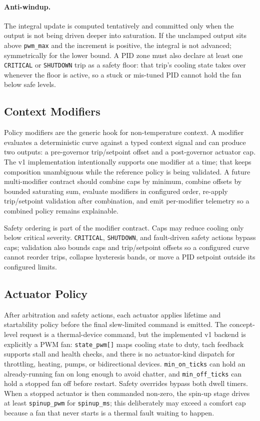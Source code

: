 \paragraph{Anti-windup.} The integral update is computed tentatively and committed only when the output is not being driven deeper into saturation. If the unclamped output sits above \texttt{pwm\_max} and the increment is positive, the integral is not advanced; symmetrically for the lower bound. A PID zone must also declare at least one \texttt{CRITICAL} or \texttt{SHUTDOWN} trip as a safety floor: that trip's cooling state takes over whenever the floor is active, so a stuck or mis-tuned PID cannot hold the fan below safe levels.

\subsection{Context Modifiers}

Policy modifiers are the generic hook for non-temperature context. A modifier evaluates a deterministic curve against a typed context signal and can produce two outputs: a pre-governor trip/setpoint offset and a post-governor actuator cap. The v1 implementation intentionally supports one modifier at a time; that keeps composition unambiguous while the reference policy is being validated. A future multi-modifier contract should combine caps by minimum, combine offsets by bounded saturating sum, evaluate modifiers in configured order, re-apply trip/setpoint validation after combination, and emit per-modifier telemetry so a combined policy remains explainable.

Safety ordering is part of the modifier contract. Caps may reduce cooling only below critical severity. \texttt{CRITICAL}, \texttt{SHUTDOWN}, and fault-driven safety actions bypass caps; validation also bounds caps and trip/setpoint offsets so a configured curve cannot reorder trips, collapse hysteresis bands, or move a PID setpoint outside its configured limits.

\subsection{Actuator Policy}

After arbitration and safety actions, each actuator applies lifetime and startability policy before the final slew-limited command is emitted. The concept-level request is a thermal-device command, but the implemented v1 backend is explicitly a PWM fan: \texttt{state\_pwm[]} maps cooling state to duty, tach feedback supports stall and health checks, and there is no actuator-kind dispatch for throttling, heating, pumps, or bidirectional devices. \texttt{min\_on\_ticks} can hold an already-running fan on long enough to avoid chatter, and \texttt{min\_off\_ticks} can hold a stopped fan off before restart. Safety overrides bypass both dwell timers. When a stopped actuator is then commanded non-zero, the spin-up stage drives at least \texttt{spinup\_pwm} for \texttt{spinup\_ms}; this deliberately may exceed a comfort cap because a fan that never starts is a thermal fault waiting to happen.

